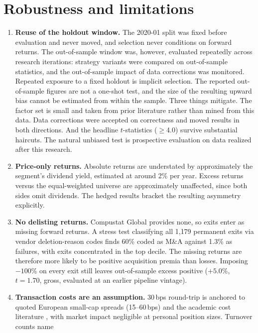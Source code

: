 \documentclass[11pt,a4paper]{article}
\begin{document}
\section{Robustness and limitations}
\label{sec:limitations}

\begin{enumerate}
  \item \textbf{Reuse of the holdout window.} The 2020-01 split was fixed
  before evaluation and never moved, and selection never conditions on
  forward returns. The out-of-sample window was, however, evaluated
  repeatedly across research iterations: strategy variants were compared
  on out-of-sample statistics, and the out-of-sample impact of data
  corrections was monitored. Repeated exposure to a fixed holdout is implicit
  selection. The reported out-of-sample figures are not a one-shot test, and
  the size of the resulting upward bias cannot be estimated from within the
  sample. Three things mitigate. The factor set is small and taken from
  prior literature rather than mined from this data. Data corrections were
  accepted on correctness and moved results in both directions. And the
  headline $t$-statistics ($\geq$4.0) survive substantial haircuts. The
  natural unbiased test is prospective evaluation on data realized after
  this research.
  \item \textbf{Price-only returns.} Absolute returns are understated by
  approximately the segment's dividend yield, estimated at around 2\% per
  year. Excess returns versus the equal-weighted universe are approximately
  unaffected, since both sides omit dividends. The hedged results bracket
  the resulting asymmetry explicitly.
  \item \textbf{No delisting returns.} Compustat Global provides none, so
  exits enter as missing forward returns. A stress test classifying all
  1{,}179 permanent exits via vendor deletion-reason codes finds 60\% coded
  as M\&A against 1.3\% as failures, with exits concentrated in the top
  decile. The missing returns are therefore more likely to be positive
  acquisition premia than losses. Imposing
  $-100\%$ on every exit still leaves out-of-sample excess positive
  ($+5.0\%$, $t{=}1.70$, gross, evaluated at an earlier pipeline vintage).
  \item \textbf{Transaction costs are an assumption.} 30\,bps round-trip is
  anchored to quoted European small-cap spreads (15--60\,bps) and the
  academic cost literature \citep{frazzini2015,novymarxvelikov2016}, with
  market impact negligible at personal position sizes. Turnover counts name

\end{enumerate}
\end{document}
